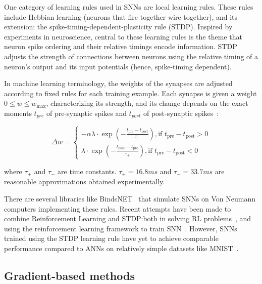 \documentclass[fyp]{socreport}
\begin{document}
One category of learning rules used in SNNs are local learning rules.  These
rules include Hebbian learning (neurons that fire together wire together), and
its extension: the spike-timing-dependent-plasticity rule (STDP). Inspired by
experiments in neuroscience, central to these learning rules is the theme that
neuron spike ordering and their relative timings encode information. STDP
adjusts the strength of connections between neurons using the relative timing of
a neuron's output and its input potentials (hence, spike-timing dependent).

In machine learning terminology, the weights of the synapses are adjusted
according to fixed rules for each training example. Each synapse is given a
weight \(0 \le w \le w_{\max}\), characterizing its strength, and its change
depends on the exact moments \(t_{pre}\) of pre-synaptic spikes and \(t_{post}\)
of post-synaptic spikes~\cite{sboev18_spikin_neural_networ_reinf_learn}:

\begin{equation} \Delta w=\left\{\begin{array}{l}{-\alpha \lambda \cdot \exp \left(-\frac{t_{\mathrm{pre}}-t_{\mathrm{post}}}{\tau_{-}}\right), \text {if } t_{\mathrm{pre}}-t_{\mathrm{post}}>0} \\ {\lambda \cdot \exp \left(-\frac{t_{\mathrm{post}}-t_{\mathrm{pre}}}{\tau_{+}}\right), \text {if } t_{\mathrm{pre}}-t_{\mathrm{post}}<0}\end{array}\right.
\end{equation}

where \(\tau_{+}\) and \(\tau_{-}\) are time constants. \(\tau_{+} = 16.8ms\)
and \(\tau_{-} = 33.7ms\) are reasonable approximations obtained experimentally.

There are several libraries like BindsNET~\cite{10.3389/fninf.2018.00089} that
simulate SNNs on Von Neumann computers implementing these rules. Recent attempts
have been made to combine Reinforcement Learning and STDP:\@ both in solving RL
problems~\cite{10.3389/fninf.2018.00089}, and using the reinforcement learning
framework to train
SNN~\cite{10.3389/fnbot.2019.00018,10.3389/fnins.2018.00435}. However, SNNs
trained using the STDP learning rule have yet to achieve comparable performance
compared to ANNs on relatively simple datasets like MNIST~\cite{TAVANAEI201947}.

\subsection{Gradient-based methods}
\end{document}
